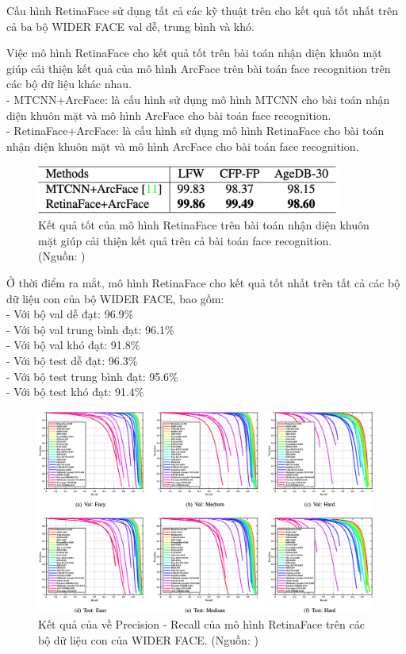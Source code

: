 {    \noindent
    Cấu hình RetinaFace sử dụng tất cả các kỹ thuật trên cho kết quả tốt nhất trên cả ba bộ WIDER FACE val dễ, trung bình và khó.

    \noindent
    Việc mô hình RetinaFace cho kết quả tốt trên bài toán nhận diện khuôn mặt giúp cải thiện kết quả của mô hình ArcFace trên bài toán face recognition trên các bộ dữ liệu khác nhau. \\
    - MTCNN+ArcFace: là cấu hình sử dụng mô hình MTCNN \cite{zhang2016joint} cho bài toán nhận diện khuôn mặt và mô hình ArcFace \cite{deng2019arcface} cho bài toán face recognition. \\
    - RetinaFace+ArcFace: là cấu hình sử dụng mô hình RetinaFace cho bài toán nhận diện khuôn mặt và mô hình ArcFace \cite{deng2019arcface} cho bài toán face recognition.

    \begin{figure}[H]
        \centering
        \includegraphics[width=10cm] {images/retinaface_results_2}
        \caption{Kết quả tốt của mô hình RetinaFace trên bài toán nhận diện khuôn mặt giúp cải thiện kết quả trên cả bài toán face recognition. (Nguồn: \cite{deng2020retinaface})}
        \label{fig:retinaface_results_2}
    \end{figure}

    \noindent
    Ở thời điểm ra mắt, mô hình RetinaFace cho kết quả tốt nhất trên tất cả các bộ dữ liệu con của bộ WIDER FACE, bao gồm: \\
    - Với bộ val dễ đạt: 96.9\% \\
    - Với bộ val trung bình đạt: 96.1\% \\
    - Với bộ val khó đạt: 91.8\% \\
    - Với bộ test dễ đạt: 96.3\% \\
    - Với bộ test trung bình đạt: 95.6\% \\
    - Với bộ test khó đạt: 91.4\%

    \begin{figure}[H]
        \centering
        \includegraphics[width=13cm] {images/retinaface_results_3}
        \caption{Kết quả của về Precision - Recall của mô hình RetinaFace trên các bộ dữ liệu con của WIDER FACE. (Nguồn: \cite{deng2020retinaface})}
        \label{fig:retinaface_results_3}
    \end{figure}

}

